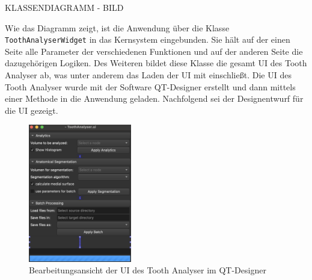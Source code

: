 KLASSENDIAGRAMM - BILD

Wie das Diagramm zeigt, ist die Anwendung über die Klasse \texttt{ToothAnalyserWidget}
in das Kernsystem eingebunden. Sie hält auf der einen Seite alle Parameter der verschiedenen
Funktionen und auf der anderen Seite die dazugehörigen Logiken. Des Weiteren
bildet diese Klasse die gesamt UI des Tooth Analyser ab, was unter anderem das Laden
der \ac{UI} mit einschließt. Die UI des Tooth Analyser wurde mit der Software QT-Designer
erstellt und dann mittels einer Methode in die Anwendung geladen. Nachfolgend
sei der Designentwurf für die \ac{UI} gezeigt.

\begin{figure}[h]
	\centering
	\includegraphics[width=0.4\textwidth]{img/toothAnalyserQT.png}
	\caption{Bearbeitungsansicht der \ac{UI} des Tooth Analyser im QT-Designer}
	\label{fig:tooth_analyser_qt}
\end{figure}

